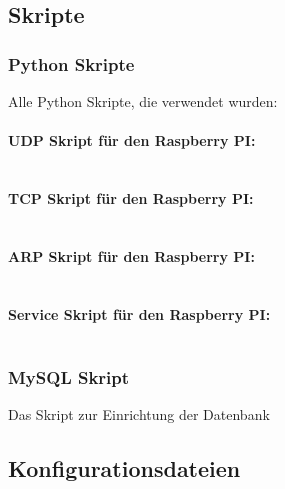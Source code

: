 
\subsection*{Skripte}  
\label{sec:Skripte-1} 

\subsubsection*{Python Skripte}
\label{sec:Pythonskripte}

Alle Python Skripte, die verwendet wurden: 

\paragraph{UDP Skript für den Raspberry PI:}$\;$ \\  

\newpage

\paragraph{TCP Skript für den Raspberry PI:}$\;$ \\  

\newpage

\paragraph{ARP Skript für den Raspberry PI:}$\;$ \\  

\newpage

\paragraph{Service Skript für den Raspberry PI:}$\;$ \\  

\newpage

\subsubsection*{MySQL Skript}
\label{sec:MySQLSkript}
Das Skript zur Einrichtung der Datenbank


\subsection*{Konfigurationsdateien}  
\label{sec:Konfigurationsdateien-1} 

